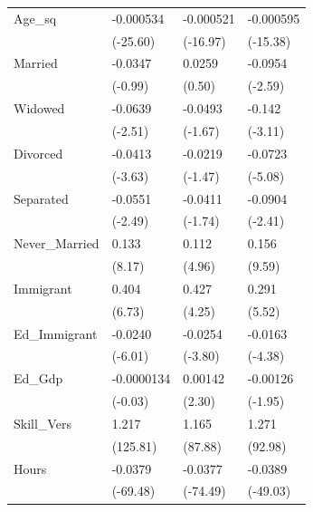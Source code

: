\begin{longtable}{p{3 cm} p{2.25 cm} p{2.25 cm} p{2.25 cm}}
Age\_sq      &   -0.000534\sym{***}&   -0.000521\sym{***}&   -0.000595\sym{***}\\
            &    (-25.60)         &    (-16.97)         &    (-15.38)         \\
Married   &     -0.0347         &      0.0259         &     -0.0954\sym{**} \\
            &     (-0.99)         &      (0.50)         &     (-2.59)         \\
Widowed   &     -0.0639\sym{*}  &     -0.0493         &      -0.142\sym{**} \\
            &     (-2.51)         &     (-1.67)         &     (-3.11)         \\
Divorced   &     -0.0413\sym{***}&     -0.0219         &     -0.0723\sym{***}\\
            &     (-3.63)         &     (-1.47)         &     (-5.08)         \\
Separated  &     -0.0551\sym{*}  &     -0.0411         &     -0.0904\sym{*}  \\
            &     (-2.49)         &     (-1.74)         &     (-2.41)         \\
Never\_Married   &      0.133\sym{***}&      0.112\sym{***}&      0.156\sym{***}\\
            &     (8.17)         &     (4.96)         &     (9.59)         \\
Immigrant      &       0.404\sym{***}&       0.427\sym{***}&       0.291\sym{***}\\
            &      (6.73)         &      (4.25)         &      (5.52)         \\
Ed\_Immigrant   &     -0.0240\sym{***}&     -0.0254\sym{***}&     -0.0163\sym{***}\\
            &     (-6.01)         &     (-3.80)         &     (-4.38)         \\
Ed\_Gdp     &  -0.0000134         &     0.00142\sym{*}  &    -0.00126         \\
            &     (-0.03)         &      (2.30)         &     (-1.95)         \\
Skill\_Vers  &       1.217\sym{***}&       1.165\sym{***}&       1.271\sym{***}\\
            &    (125.81)         &     (87.88)         &     (92.98)         \\
Hours       &     -0.0379\sym{***}&     -0.0377\sym{***}&     -0.0389\sym{***}\\
            &    (-69.48)         &    (-74.49)         &    (-49.03)         \\


\end{longtable}
